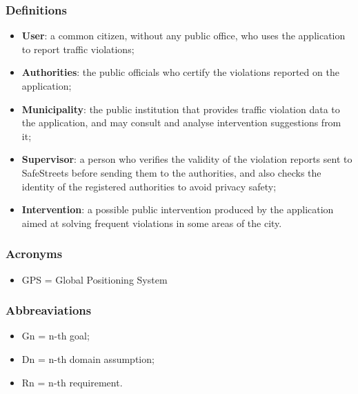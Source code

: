 \subsubsection{Definitions}
	\begin{itemize}
		\item \textbf{User}: a common citizen, without any public office, who uses the application to report traffic violations;
		\item \textbf{Authorities}: the public officials who certify the violations reported on the application;
		\item \textbf{Municipality}: the public institution that provides traffic violation data to the application, and may consult and analyse intervention suggestions from it;
		\item \textbf{Supervisor}: a person who verifies the validity of the violation reports sent to SafeStreets before sending them to the authorities, and also checks the identity of the registered authorities to avoid privacy safety;
		\item \textbf{Intervention}: a possible public intervention produced by the application aimed at solving frequent violations in some areas of the city.
	\end{itemize}
\subsubsection{Acronyms}
\begin{itemize}
	\item GPS = Global Positioning System
\end{itemize}
\subsubsection{Abbreaviations}
\begin{itemize}
	\item Gn = n-th goal;
	\item Dn = n-th domain assumption;
	\item Rn = n-th requirement.
\end{itemize}